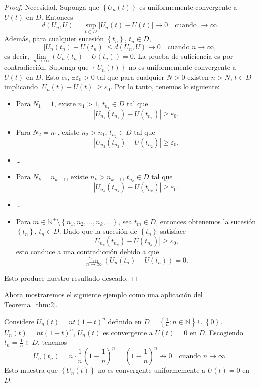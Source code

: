 \begin{proof}
	Necesidad. Suponga que $\left\{U_{n}\left(t\right)\right\}$ es uniformemente convergente a $U\left(t\right)$ en $D$. Entonces \[ d\left(U_{n},U\right)=\sup_{t\in D}\left|U_{n}\left(t\right)-U\left(t\right)\right|\to0\quad\text{cuando }\to\infty. \] Además, para cualquier sucesión $\left\{t_{n}\right\}$, $t_{n}\in D$, \[ \left|U_{n}\left(t_{n}\right)-U\left(t_{n}\right)\right|\leq d\left(U_{n},U\right)\to0\quad\text{cuando }n\to\infty, \] es decir, $\lim\limits_{n\to\infty}\left(U_{n}\left(t_{n}\right)-U\left(t_{n}\right)\right)=0$. La prueba de suficiencia es por contradicción. Suponga que $\left\{U_{n}\left(t\right)\right\}$ no es uniformemente convergente a $U\left(t\right)$ en $D$. Esto es, $\exists\varepsilon_{0}>0$ tal que para cualquier $N>0$ existen $n>N$, $t\in D$ implicando $\left|U_{n}\left(t\right)-U\left(t\right)\right|\geq\varepsilon_{0}$. Por lo tanto, tenemos lo siguiente:
	\begin{itemize}
		\item Para $N_{1}=1$, existe $n_{1}>1$, $t_{n_{1}}\in D$ tal que \[ \left|U_{n_{1}}\left(t_{n_{1}}\right)-U\left(t_{n_{1}}\right)\right|\geq\varepsilon_{0}. \]
		\item Para $N_{2}=n_{1}$, existe $n_{2}>n_{1}$, $t_{n_{2}}\in D$ tal que \[ \left|U_{n_{2}}\left(t_{n_{2}}\right)-U\left(t_{n_{2}}\right)\right|\geq\varepsilon_{0}. \]
		\item \ldots
		\item Para $N_{k}=n_{k-1}$, existe $n_{k}>n_{k-1}$, $t_{n_{k}}\in D$ tal que \[ \left|U_{n_{k}}\left(t_{n_{k}}\right)-U\left(t_{n_{k}}\right)\right|\geq\varepsilon_{0}. \]
		\item \ldots
		\item Para $m\in\mathds{N}^{+}\setminus\left\{n_{1},n_{2},\ldots,n_{k},\ldots\right\}$, sea $t_{m}\in D$, entonces obtenemos la sucesión $\left\{t_{n}\right\}$, $t_{n}\in D$. Dado que la sucesión de $\left\{t_{n}\right\}$ satisface \[ \left|U_{n_{k}}\left(t_{n_{k}}\right)-U\left(t_{n_{k}}\right)\right|\geq\varepsilon_{0}, \] esto conduce a una contradicción debido a que \[ \lim_{n\to\infty}\left(U_{n}\left(t_{n}\right)-U\left(t_{n}\right)\right)=0. \]
	\end{itemize}
Esto produce nuestro resultado deseado.
\end{proof}
Ahora mostraremos el siguiente ejemplo como una aplicación del Teorema~\ref{thm:2}.
\begin{example}
	Considere $U_{n}\left(t\right)=nt{\left(1-t\right)}^{n}$ definido en $D=\left\{\frac{1}{n}:n\in\mathds{N}\right\}\cup\left\{0\right\}$. $U_{n}\left(t\right)=nt{\left(1-t\right)}^{n}$, $U_{n}\left(t\right)$ es convergente a $U\left(t\right)=0$ en $D$. Escogiendo $t_{n}=\frac{1}{n}\in D$, tenemos \[ U_{n}\left(t_{n}\right)=n\cdot\frac{1}{n}{\left(1-\frac{1}{n}\right)}^{n}={\left(1-\frac{1}{n}\right)}^{n}\not\to0\quad\text{cuando }n\to\infty. \] Esto muestra que $\left\{U_{n}\left(t\right)\right\}$ no es convergente uniformemente a $U\left(t\right)=0$ en $D$.
\end{example}

